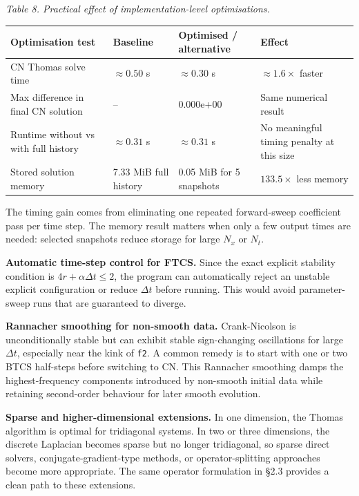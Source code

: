 \documentclass[11pt,a4paper]{article}
\begin{document}
\emph{Table 8. Practical effect of implementation-level optimisations.}

\begin{center}
\renewcommand{\arraystretch}{1.15}
\begin{tabular}{|p{}|p{}|p{}|p{}|}
\hline
Optimisation test & Baseline & Optimised / alternative & Effect \\
\hline
CN Thomas solve time & $\approx 0.50$ s & $\approx 0.30$ s & $\approx 1.6\times$ faster \\
Max difference in final CN solution & -- & 0.000e+00 & Same numerical result \\
Runtime without vs with full history & $\approx 0.31$ s & $\approx 0.31$ s & No meaningful timing penalty at this size \\
Stored solution memory & 7.33 MiB full history & 0.05 MiB for 5 snapshots & $133.5\times$ less memory \\
\hline
\end{tabular}
\end{center}

The timing gain comes from eliminating one repeated forward-sweep coefficient pass per time step. The memory result matters when only a few output times are needed: selected snapshots reduce storage for large $N_x$ or $N_t$.

\textbf{Automatic time-step control for FTCS.} Since the exact explicit stability condition is $4r+\alpha\Delta t\le 2$, the program can automatically reject an unstable explicit configuration or reduce $\Delta t$ before running. This would avoid parameter-sweep runs that are guaranteed to diverge.

\textbf{Rannacher smoothing for non-smooth data.} Crank-Nicolson is unconditionally stable but can exhibit stable sign-changing oscillations for large $\Delta t$, especially near the kink of \texttt{f2}. A common remedy is to start with one or two BTCS half-steps before switching to CN. This Rannacher smoothing damps the highest-frequency components introduced by non-smooth initial data while retaining second-order behaviour for later smooth evolution.

\textbf{Sparse and higher-dimensional extensions.} In one dimension, the Thomas algorithm is optimal for tridiagonal systems. In two or three dimensions, the discrete Laplacian becomes sparse but no longer tridiagonal, so sparse direct solvers, conjugate-gradient-type methods, or operator-splitting approaches become more appropriate. The same operator formulation in §2.3 provides a clean path to these extensions.
\end{document}

